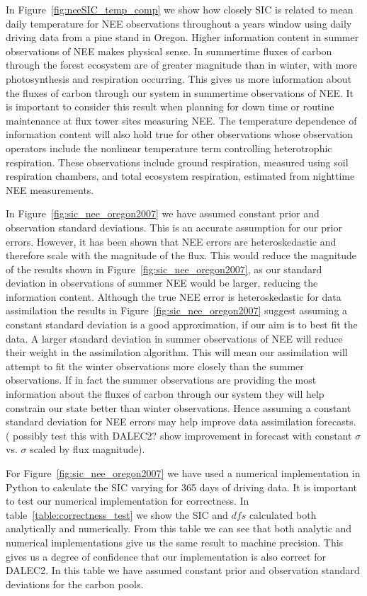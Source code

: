 \documentclass[11pt]{article}
\begin{document}
In Figure~\ref{fig:neeSIC_temp_comp} we show how closely SIC is related to mean daily temperature for NEE observations throughout a years window using daily driving data from a pine stand in Oregon. Higher information content in summer observations of NEE makes physical sense. In summertime fluxes of carbon through the forest ecosystem are of greater magnitude than in winter, with more photosynthesis and respiration occurring. This gives us more information about the fluxes of carbon through our system in summertime observations of NEE. It is important to consider this result when planning for down time or routine maintenance at flux tower sites measuring NEE. The temperature dependence of information content will also hold true for other observations whose observation operators include the nonlinear temperature term controlling heterotrophic respiration. These observations include ground respiration, measured using soil respiration chambers, and total ecosystem respiration, estimated from nighttime NEE measurements.

In Figure~\ref{fig:sic_nee_oregon2007} we have assumed constant prior and observation standard deviations. This is an accurate assumption for our prior errors. However, it has been shown that NEE errors are heteroskedastic \citep{Richardson200838} and therefore scale with the magnitude of the flux. This would reduce the magnitude of the results shown in Figure~\ref{fig:sic_nee_oregon2007}, as our standard deviation in observations of summer NEE would be larger, reducing the information content. Although the true NEE error is heteroskedastic for data assimilation the results in Figure~\ref{fig:sic_nee_oregon2007} suggest assuming a constant standard deviation is a good approximation, if our aim is to best fit the data. A larger standard deviation in summer observations of NEE will reduce their weight in the assimilation algorithm. This will mean our assimilation will attempt to fit the winter observations more closely than the summer observations. If in fact the summer observations are providing the most information about the fluxes of carbon through our system they will help constrain our state better than winter observations. Hence assuming a constant standard deviation for NEE errors may help improve data assimilation forecasts. ({\color{red} possibly test this with DALEC2? show improvement in forecast with constant $\sigma$ vs. $\sigma$ scaled by flux magnitude}).

For Figure~\ref{fig:sic_nee_oregon2007} we have used a numerical implementation in Python to calculate the SIC varying for 365 days of driving data. It is important to test our numerical implementation for correctness. In table~\ref{table:correctness_test} we show the SIC and \(dfs\) calculated both analytically and numerically. From this table we can see that both analytic and numerical implementations give us the same result to machine precision. This gives us a degree of confidence that our implementation is also correct for DALEC2. In this table we have assumed constant prior and observation standard deviations for the carbon pools.
\end{document}
